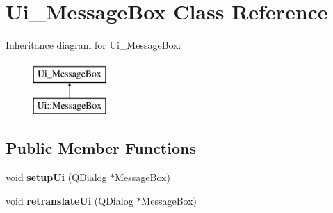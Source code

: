 \hypertarget{classUi__MessageBox}{\section{Ui\-\_\-\-Message\-Box Class Reference}
\label{classUi__MessageBox}
}
Inheritance diagram for Ui\-\_\-\-Message\-Box\-:\begin{figure}[H]
\begin{center}
\leavevmode
\includegraphics[height=2.000000cm]{d9/d1e/classUi__MessageBox}
\end{center}
\end{figure}
\subsection*{Public Member Functions}
\begin{DoxyCompactItemize}
\item 
\hypertarget{classUi__MessageBox_a068d06fa86e3756881e202a0a0245759}{void {\bfseries setup\-Ui} (Q\-Dialog $\ast$Message\-Box)}\label{classUi__MessageBox_a068d06fa86e3756881e202a0a0245759}

\item 
\hypertarget{classUi__MessageBox_a4f4dbd8f63ab245c0d9dfcdec2f907f2}{void {\bfseries retranslate\-Ui} (Q\-Dialog $\ast$Message\-Box)}\label{classUi__MessageBox_a4f4dbd8f63ab245c0d9dfcdec2f907f2}

\end{DoxyCompactItemize}

